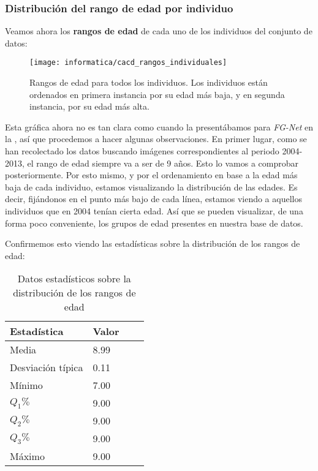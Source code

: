 \subsubsection{Distribución del rango de edad por individuo}

Veamos ahora los \textbf{rangos de edad} de cada uno de los individuos del conjunto de datos:

\begin{figure}[H]
    \centering
    \texttt{[image: informatica/cacd\_rangos\_individuales]}
    \caption{Rangos de edad para todos los individuos. Los individuos están ordenados en primera instancia por su edad más baja, y en segunda instancia, por su edad más alta.}
\end{figure}

Esta gráfica ahora no es tan clara como cuando la presentábamos para \textit{FG-Net} en la , así que procedemos a hacer algunas observaciones. En primer lugar, como se han recolectado los datos buscando imágenes correspondientes al periodo 2004-2013, el rango de edad siempre va a ser de 9 años. Esto lo vamos a comprobar posteriormente. Por esto mismo, y por el ordenamiento en base a la edad más baja de cada individuo, estamos visualizando la distribución de las edades. Es decir, fijándonos en el punto más bajo de cada línea, estamos viendo a aquellos individuos que en 2004 tenían cierta edad. Así que se pueden visualizar, de una forma poco conveniente, los grupos de edad presentes en nuestra base de datos.

Confirmemos esto viendo las estadísticas sobre la distribución de los rangos de edad:

\begin{table}[H]
\centering
\begin{tabular}{|l|l|l|l|}
    \hline
    \textbf{Estadística} & \textbf{Valor} \\
    \hline

    Media             & 8.99 \\
    Desviación típica & 0.11 \\
    Mínimo            & 7.00 \\
    $Q_1 \%$          & 9.00 \\
    $Q_2 \%$          & 9.00 \\
    $Q_3 \%$          & 9.00 \\
    Máximo            & 9.00 \\

    \hline

\end{tabular}
    \caption{Datos estadísticos sobre la distribución de los rangos de edad}
\end{table}

